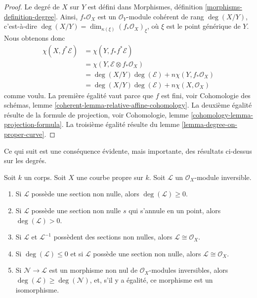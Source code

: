 \begin{proof}
Le degré de $X$ sur $Y$ est défini dans
Morphismes, définition \ref{morphisms-definition-degree}.
Ainsi, $f_*\mathcal{O}_X$ est un $\mathcal{O}_Y$-module cohérent
de rang $\deg(X/Y)$, c'est-à-dire
$\deg(X/Y) = \dim_{\kappa(\xi)} (f_*\mathcal{O}_X)_\xi$, où $\xi$
est le point générique de $Y$. Nous obtenons donc
\begin{align*}
\chi(X, f^*\mathcal{E})
& =
\chi(Y, f_*f^*\mathcal{E}) \\
& =
\chi(Y, \mathcal{E} \otimes f_*\mathcal{O}_X) \\
& =
\deg(X/Y) \deg(\mathcal{E}) + n \chi(Y, f_*\mathcal{O}_X) \\
& =
\deg(X/Y) \deg(\mathcal{E}) + n \chi(X, \mathcal{O}_X)
\end{align*}
comme voulu. La première égalité vaut parce que $f$ est fini, voir
Cohomologie des schémas, lemme \ref{coherent-lemma-relative-affine-cohomology}.
La deuxième égalité résulte de la formule de projection, voir
Cohomologie, lemme \ref{cohomology-lemma-projection-formula}.
La troisième égalité résulte du lemme \ref{lemma-degree-on-proper-curve}.
\end{proof}

\noindent
Ce qui suit est une conséquence évidente, mais importante, des
résultats ci-dessus sur les degrés.

\begin{lemma}
\label{lemma-check-invertible-sheaf-trivial}
Soit $k$ un corps. Soit $X$ une courbe propre sur $k$.
Soit $\mathcal{L}$ un $\mathcal{O}_X$-module inversible.
\begin{enumerate}
\item Si $\mathcal{L}$ possède une section non nulle, alors
$\deg(\mathcal{L}) \geq 0$.
\item Si $\mathcal{L}$ possède une section non nulle $s$ qui s'annule
en un point, alors $\deg(\mathcal{L}) > 0$.
\item Si $\mathcal{L}$ et $\mathcal{L}^{-1}$ possèdent des sections non nulles, alors
$\mathcal{L} \cong \mathcal{O}_X$.
\item Si $\deg(\mathcal{L}) \leq 0$ et si $\mathcal{L}$ possède une section non nulle,
alors $\mathcal{L} \cong \mathcal{O}_X$.
\item Si $\mathcal{N} \to \mathcal{L}$ est un morphisme non nul de
$\mathcal{O}_X$-modules inversibles, alors $\deg(\mathcal{L}) \geq \deg(\mathcal{N})$,
et, s'il y a égalité, ce morphisme est un isomorphisme.
\end{enumerate}
\end{lemma}

